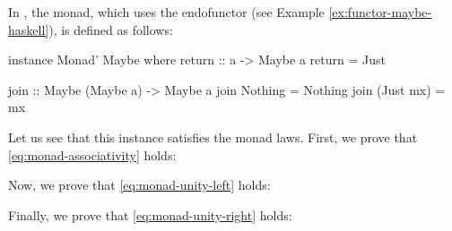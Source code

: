 \begin{example}
  \label{ex:monad-maybe-haskell}

  In \hask, the  monad, which uses the
   endofunctor (see Example
  \ref{ex:functor-maybe-haskell}), is defined as follows:
  \begin{codehaskell}
instance Monad' Maybe where
  return :: a -> Maybe a
  return = Just

  join :: Maybe (Maybe a) -> Maybe a
  join Nothing   = Nothing
  join (Just mx) = mx
  \end{codehaskell}
  Let us see that this instance satisfies the monad laws. First, we
  prove that \eqref{eq:monad-associativity} holds:

  \vspace{1em}
  \begin{steps}
  \end{steps}
  \begin{steps}
  \end{steps}
  Now, we prove that \eqref{eq:monad-unity-left} holds:
  \begin{steps}
  \end{steps}
  Finally, we prove that \eqref{eq:monad-unity-right} holds:

  \vspace{1em}
  \begin{steps}
  \end{steps}
  \begin{steps}
  \end{steps}

\end{example}

